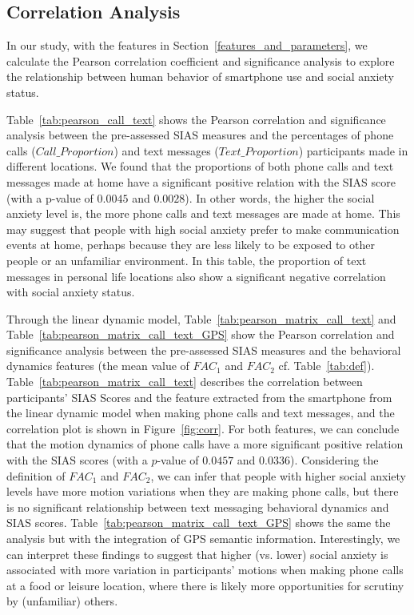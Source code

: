 \subsection{Correlation Analysis}
In our study, with the features in Section~\ref{features_and_parameters}, we calculate the Pearson correlation coefficient and significance analysis to explore the relationship between human behavior of smartphone use and social anxiety status.


Table~\ref{tab:pearson_call_text} shows the Pearson correlation and significance analysis between the pre-assessed SIAS measures and the percentages of phone calls ($Call\_Proportion$) and text messages ($Text\_Proportion$) participants made in different locations. We found that  the proportions of both phone calls and text messages made at home have a significant positive relation with the SIAS score (with a p-value of $0.0045$ and $0.0028$). In other words, the higher the social anxiety level is, the more phone calls and text messages are made at home. This may suggest that people with high social anxiety prefer to make communication events at home, perhaps because they are less likely to be exposed to other people or an unfamiliar environment. In this table, the proportion of text messages in personal life locations also show a significant negative correlation with social anxiety status. 


Through the linear dynamic model, Table~\ref{tab:pearson_matrix_call_text} and Table~\ref{tab:pearson_matrix_call_text_GPS} show the Pearson correlation and significance analysis between the pre-assessed SIAS measures and the behavioral dynamics features (the mean value of $FAC_1$ and $FAC_2$ cf. Table~\ref{tab:def}).  Table~\ref{tab:pearson_matrix_call_text} describes the  correlation between participants' SIAS Scores and the feature extracted from the smartphone from the linear dynamic model when making phone calls and text messages, and the correlation plot is shown in Figure~\ref{fig:corr}. For both features, we can conclude that the motion dynamics of phone calls have a more significant positive relation with the SIAS scores (with a $p$-value of $0.0457$ and $0.0336$). Considering the definition of  $FAC_1$ and $FAC_2$, we can infer that people with higher social anxiety levels have more motion variations when they are making phone calls, but there is no significant relationship between text messaging behavioral dynamics and SIAS scores. 
% 
% 
Table~\ref{tab:pearson_matrix_call_text_GPS} shows the same the analysis but with the integration of GPS semantic information. Interestingly, we can interpret these findings to suggest that higher (vs. lower) social anxiety is associated with more variation in participants' motions when making phone calls at a food or leisure location, where there is likely more opportunities for scrutiny by (unfamiliar) others. 




